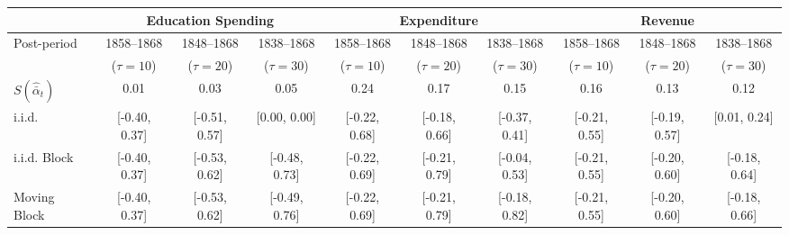 \begin{tabular}{@{}lccccccccc@{}}
		\toprule
		 & \multicolumn{3}{c}{Education Spending}        & \multicolumn{3}{c}{Expenditure}            & \multicolumn{3}{c}{Revenue}                \\ \midrule
Post-period	 & 1858--1868     & 1848--1868      & 1838--1868      & 1858--1868     & 1848--1868      & 1838--1868  	  & 1858--1868     & 1848--1868      & 1838--1868   \\
	 	 & ($\tau = 10$)  & ($\tau = 20$)   & ($\tau = 30$)   & ($\tau = 10$)  & ($\tau = 20$)  & ($\tau = 30$)   &  ($\tau = 10$)  &  ($\tau = 20$)  &  ($\tau = 30$)  \\
		\hline
		$S (\hat{\bar{\alpha}}_{t})$        &   0.01       	 & 	0.03       	  & 	0.05       &       0.24    &   0.17	       & 	0.15	   & 	0.16       &   0.13        & 	0.12\\
		i.i.d.                      		& [-0.40, 0.37]  & [-0.51, 0.57]  & [0.00, 0.00]   & [-0.22, 0.68] & [-0.18, 0.66] & [-0.37, 0.41] & [-0.21, 0.55] & [-0.19, 0.57] & [0.01, 0.24] \\
		i.i.d. Block                        & [-0.40, 0.37]  & [-0.53, 0.62]  & [-0.48, 0.73]   & [-0.22, 0.69] & [-0.21, 0.79] & [-0.04, 0.53] & [-0.21, 0.55] & [-0.20, 0.60] & [-0.18, 0.64] \\
		Moving Block                        & [-0.40, 0.37]  & [-0.53, 0.62]  & [-0.49, 0.76]  & [-0.22, 0.69] & [-0.21, 0.79] & [-0.18, 0.82] & [-0.21, 0.55] & [-0.20, 0.60] & [-0.18, 0.66] \\ \bottomrule
\end{tabular}

